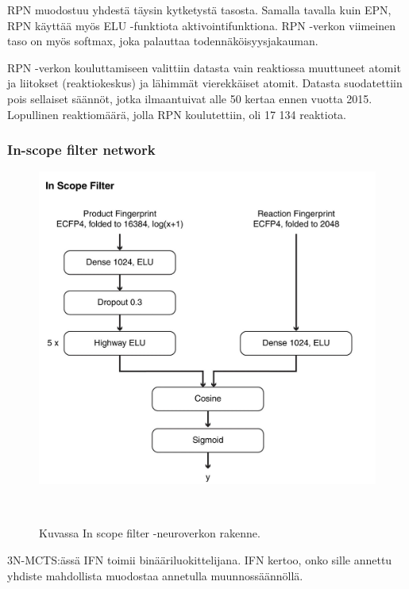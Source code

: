 \documentclass[finnish,twoside,censored,tkt,sw-line]{HYthesisML}
\begin{document}
RPN muodostuu yhdestä täysin kytketystä tasosta.
Samalla tavalla kuin EPN, RPN käyttää myös ELU -funktiota aktivointifunktiona.
RPN -verkon viimeinen taso on myös softmax, joka palauttaa todennäköisyysjakauman.

RPN -verkon kouluttamiseen valittiin datasta vain reaktiossa muuttuneet atomit ja liitokset (reaktiokeskus) ja lähimmät vierekkäiset atomit.
Datasta suodatettiin pois sellaiset säännöt, jotka ilmaantuivat alle 50 kertaa ennen vuotta 2015.
Lopullinen reaktiomäärä, jolla RPN koulutettiin, oli 17 134 reaktiota.

\subsubsection{In-scope filter network}

\begin{figure}
    \centering
    \includegraphics[]{in-scope-filter.jpg}
    \caption{Kuvassa In scope filter -neuroverkon rakenne.}
    {~\cite{SeglerMarwinHS2018Pcsw}}
\end{figure}


3N-MCTS:ässä IFN toimii binääriluokittelijana.
IFN kertoo, onko sille annettu yhdiste mahdollista muodostaa annetulla muunnossäännöllä.
\end{document}
